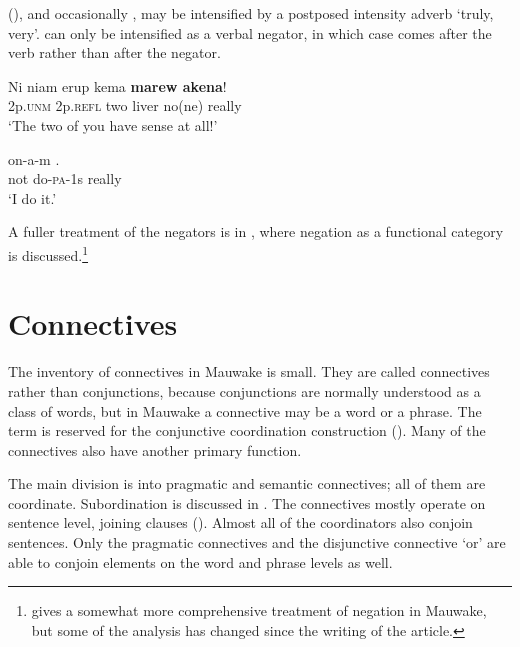 \textstyleStyleVernacularWordsItalic{} (),  and occasionally , may be intensified by a postposed intensity adverb  `truly, very'.  can only be intensified as a verbal negator, in which case  comes after the verb rather than after the negator.

\ea%
\label{ex:x652}
\gll Ni niam erup kema\textbf{ marew akena}! \\
2p.\textsc{unm} 2p.\textsc{refl} two liver no(ne) really\\
\glt`The two of you have  sense at all!'
\z

\ea%
\label{ex:x653}
\gll {} on-a-m . \\
not do-\textsc{pa}-1s really\\
\glt`I  do it.'
\z

A fuller treatment of the negators is in , where negation as a functional category is discussed.\footnote{\citet{Berghall2006} gives a somewhat more comprehensive treatment of negation in Mauwake, but some of the analysis has changed since the writing of the article.}

\section{Connectives}
{}
The inventory of connectives in Mauwake is small. They are called connectives rather than conjunctions, because conjunctions are normally understood as a class of words, but in Mauwake a connective may be a word or a phrase. The term  is reserved for the conjunctive coordination construction (). Many of the connectives also have another primary function. 

The main division is into pragmatic and semantic connectives; all of them are coordinate. Subordination is discussed in . The connectives mostly operate on sentence level, joining clauses (). Almost all of the coordinators also conjoin sentences. Only the pragmatic connectives and the disjunctive connective  `or' are able to conjoin elements on the word and phrase levels as well. 


